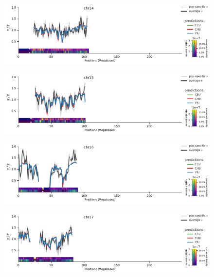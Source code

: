 \documentclass[11pt]{article}
\begin{document}
\begin{figure}[!htb]
  \centering
  \includegraphics[width=\textwidth]{figures/supplementary/pred_plot_chr14.pdf}
  \label{suppfig:fit-chr14}
\end{figure}


\begin{figure}[!htb]
  \centering
  \includegraphics[width=\textwidth]{figures/supplementary/pred_plot_chr15.pdf}
  \label{suppfig:fit-chr15}
\end{figure}


\begin{figure}[!htb]
  \centering
  \includegraphics[width=\textwidth]{figures/supplementary/pred_plot_chr16.pdf}
  \label{suppfig:fit-chr16}
\end{figure}


\begin{figure}[!htb]
  \centering
  \includegraphics[width=\textwidth]{figures/supplementary/pred_plot_chr17.pdf}
  \label{suppfig:fit-chr17}
\end{figure}
\end{document}
